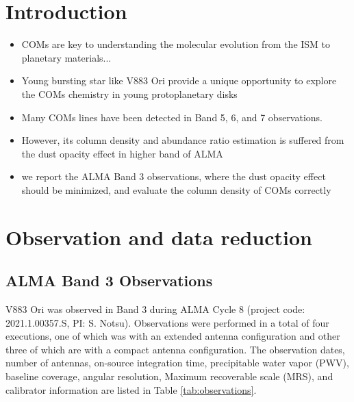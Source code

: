 \documentclass[linenumbers, twocolumn, times]{aastex631}
\begin{document}
\section{Introduction} \label{sec:intro}
\begin{itemize}
    \item COMs are key to understanding the molecular evolution from the ISM to planetary materials...
    \item Young bursting star like V883 Ori provide a unique opportunity to explore the COMs chemistry in young protoplanetary disks
    \item Many COMs lines have been detected in Band 5, 6, and 7 observations.
    \item However, its column density and abundance ratio estimation is suffered from the dust opacity effect in higher band of ALMA
    \item we report the ALMA Band 3 observations, where the dust opacity effect should be minimized, and evaluate the column density of COMs correctly
\end{itemize}

\section{Observation and data reduction} \label{sec:observation}

\subsection{ALMA Band 3 Observations}
V883 Ori was observed in Band 3 during ALMA Cycle 8 (project code: 2021.1.00357.S, PI: S. Notsu). Observations were performed in a total of four executions, one of which was with an extended antenna configuration and other three of which are with a compact antenna configuration. The observation dates, number of antennas, on-source integration time, precipitable water vapor (PWV), baseline coverage, angular resolution, Maximum recoverable scale (MRS), and calibrator information are listed in Table \ref{tab:observations}. 
\end{document}
